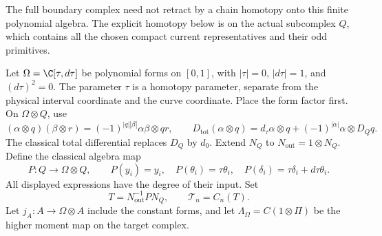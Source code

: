 The full boundary complex need not retract by a chain homotopy onto
this finite polynomial algebra.  The explicit homotopy below is on
the actual subcomplex $Q$, which contains all the chosen compact
current representatives and their odd primitives.

Let $\Omega=\C[\tau,d\tau]$ be polynomial forms on $[0,1]$, with
$|\tau|=0$, $|d\tau|=1$, and $(d\tau)^2=0$.
The parameter $\tau$ is a homotopy parameter, separate from the
physical interval coordinate and the curve coordinate.
Place the form factor first.  On $\Omega\otimes Q$, use
\[
 (\alpha\otimes q)(\beta\otimes r)
       =(-1)^{|q||\beta|}\alpha\beta\otimes qr,
 \qquad
 D_{\mathrm{tot}}(\alpha\otimes q)
       =d_\tau\alpha\otimes q+(-1)^{|\alpha|}\alpha\otimes D_Qq.
\]
The classical total differential replaces $D_Q$ by $d_0$.
Extend $N_Q$ to $N_{\mathrm{out}}=1\otimes N_Q$.
Define the classical algebra map
\[
 P:Q\longrightarrow\Omega\otimes Q,\qquad
 P(y_i)=y_i,\quad P(\theta_i)=\tau\theta_i,
 \quad P(\delta_i)=\tau\delta_i+d\tau\theta_i.
\]
All displayed expressions have the degree of their input.
Set
\[
 T=N_{\mathrm{out}}^{-1}PN_Q,
 \qquad \mathcal T_n=C_n(T).
\]
Let $j_A:A\to\Omega\otimes A$ include the constant forms,
and let $\Lambda_\Omega=C(1\otimes\Pi)$ be the higher moment
map on the target complex.

